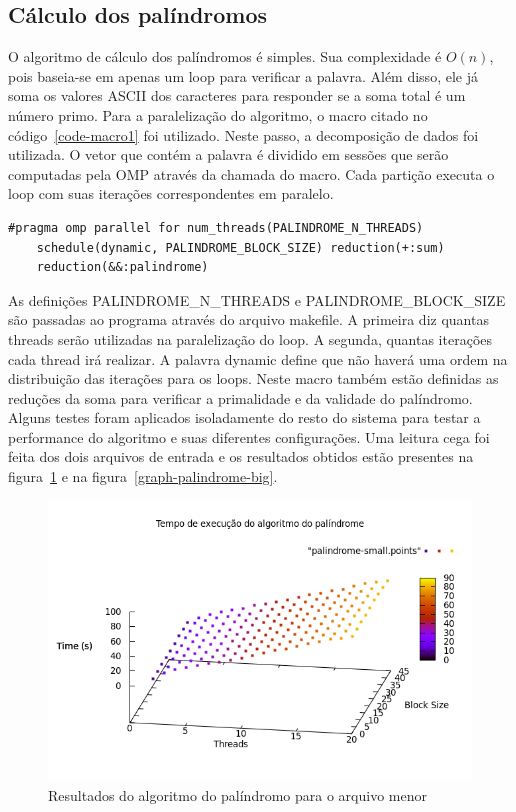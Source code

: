 \documentclass[a4paper]{article}
\begin{document}
\subsection{Cálculo dos palíndromos}
\indent \indent O algoritmo de cálculo dos palíndromos é simples. Sua complexidade é \begin{math}O(n)\end{math}, pois baseia-se em apenas um loop para verificar a palavra. Além disso, ele já soma os valores ASCII dos caracteres para responder se a soma total é um número primo. Para a paralelização do algoritmo, o macro citado no código~\ref{code-macro1} foi utilizado. Neste passo, a decomposição de dados foi utilizada. O vetor que contém a palavra é dividido em sessões que serão computadas pela OMP através da chamada do macro. Cada partição executa o loop com suas iterações correspondentes em paralelo.
\begin{lstlisting}[caption=Macro que paraleliza o algoritmo do palíndromo, float=h, label=code-macro1]
#pragma omp parallel for num_threads(PALINDROME_N_THREADS) 
	schedule(dynamic, PALINDROME_BLOCK_SIZE) reduction(+:sum) 
	reduction(&&:palindrome)
\end{lstlisting}
As definições PALINDROME\_N\_THREADS e PALINDROME\_BLOCK\_SIZE são passadas ao programa através do arquivo makefile. A primeira diz quantas threads serão utilizadas na paralelização do loop. A segunda, quantas iterações cada thread irá realizar. A palavra dynamic define que não haverá uma ordem na distribuição das iterações para os loops. Neste macro também estão definidas as reduções da soma para verificar a primalidade e da validade do palíndromo.\\
\indent Alguns testes foram aplicados isoladamente do resto do sistema para testar a performance do algoritmo e suas diferentes configurações. Uma leitura cega foi feita dos dois arquivos de entrada e os resultados obtidos estão presentes na figura~\ref{graph-palindrome-small} e na figura~\ref{graph-palindrome-big}.
\begin{figure}
	\includegraphics[scale=0.5]{graph-palindrome-small}
	\caption{Resultados do algoritmo do palíndromo para o arquivo menor}
	\label{graph-palindrome-small}
\end{figure}
\end{document}
